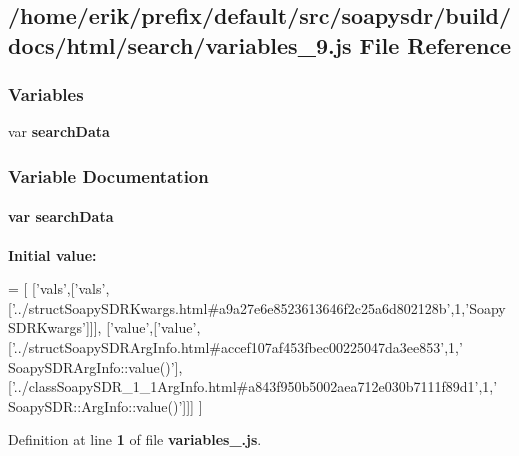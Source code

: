 \subsection{/home/erik/prefix/default/src/soapysdr/build/docs/html/search/variables\+\_\+9.js File Reference}
\label{variables__9_8js}
\subsubsection*{Variables}
\begin{DoxyCompactItemize}
\item 
var {\bf search\+Data}
\end{DoxyCompactItemize}


\subsubsection{Variable Documentation}
\paragraph[{search\+Data}]{\setlength{\rightskip}{0pt plus 5cm}var search\+Data}\label{variables__9_8js_ad01a7523f103d6242ef9b0451861231e}
{\bfseries Initial value\+:}
\begin{DoxyCode}
=
[
  [\textcolor{stringliteral}{'vals'},[\textcolor{stringliteral}{'vals'},[\textcolor{stringliteral}{'../structSoapySDRKwargs.html#a9a27e6e8523613646f2c25a6d802128b'},1,\textcolor{stringliteral}{'SoapySDRKwargs'}]]],
  [\textcolor{stringliteral}{'value'},[\textcolor{stringliteral}{'value'},[\textcolor{stringliteral}{'../structSoapySDRArgInfo.html#accef107af453fbec00225047da3ee853'},1,\textcolor{stringliteral}{'
      SoapySDRArgInfo::value()'}],[\textcolor{stringliteral}{'../classSoapySDR\_1\_1ArgInfo.html#a843f950b5002aea712e030b7111f89d1'},1,\textcolor{stringliteral}{'
      SoapySDR::ArgInfo::value()'}]]]
]
\end{DoxyCode}


Definition at line {\bf 1} of file {\bf variables\+\_.\+js}.

